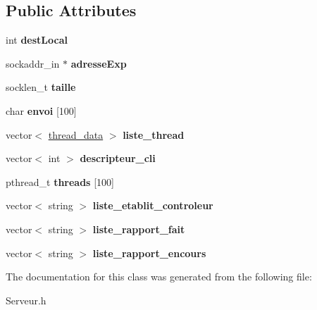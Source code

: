 \subsection*{\-Public \-Attributes}
\begin{DoxyCompactItemize}
\item 
\hypertarget{class_serveur_a606f8c26e8ddeba7bb84e8661525e37f}{int {\bfseries dest\-Local}}\label{class_serveur_a606f8c26e8ddeba7bb84e8661525e37f}

\item 
\hypertarget{class_serveur_a745aeefe5b63991eefffb6b1b79762f4}{sockaddr\-\_\-in $\ast$ {\bfseries adresse\-Exp}}\label{class_serveur_a745aeefe5b63991eefffb6b1b79762f4}

\item 
\hypertarget{class_serveur_a03c8b41efd2a24cceefe748f3986dc88}{socklen\-\_\-t {\bfseries taille}}\label{class_serveur_a03c8b41efd2a24cceefe748f3986dc88}

\item 
\hypertarget{class_serveur_a1abee959761a58815f7878483c635fa5}{char {\bfseries envoi} \mbox{[}100\mbox{]}}\label{class_serveur_a1abee959761a58815f7878483c635fa5}

\item 
\hypertarget{class_serveur_abc61f04a941acabe63665a6147321c04}{vector$<$ \hyperlink{struct_serveur_1_1thread__data}{thread\-\_\-data} $>$ {\bfseries liste\-\_\-thread}}\label{class_serveur_abc61f04a941acabe63665a6147321c04}

\item 
\hypertarget{class_serveur_a350976885f84b87f2c6533b4b327a867}{vector$<$ int $>$ {\bfseries descripteur\-\_\-cli}}\label{class_serveur_a350976885f84b87f2c6533b4b327a867}

\item 
\hypertarget{class_serveur_ab55a69165d516980da7587b35f67584a}{pthread\-\_\-t {\bfseries threads} \mbox{[}100\mbox{]}}\label{class_serveur_ab55a69165d516980da7587b35f67584a}

\item 
\hypertarget{class_serveur_a0b74dc824f0b93f9fd141723c46033d2}{vector$<$ string $>$ {\bfseries liste\-\_\-etablit\-\_\-controleur}}\label{class_serveur_a0b74dc824f0b93f9fd141723c46033d2}

\item 
\hypertarget{class_serveur_a7e782ca7679ec1a84dd79ac36a214df6}{vector$<$ string $>$ {\bfseries liste\-\_\-rapport\-\_\-fait}}\label{class_serveur_a7e782ca7679ec1a84dd79ac36a214df6}

\item 
\hypertarget{class_serveur_ac7776debc1b77647886d34bad7d39580}{vector$<$ string $>$ {\bfseries liste\-\_\-rapport\-\_\-encours}}\label{class_serveur_ac7776debc1b77647886d34bad7d39580}

\end{DoxyCompactItemize}


\-The documentation for this class was generated from the following file\-:\begin{DoxyCompactItemize}
\item 
\-Serveur.\-h\end{DoxyCompactItemize}

